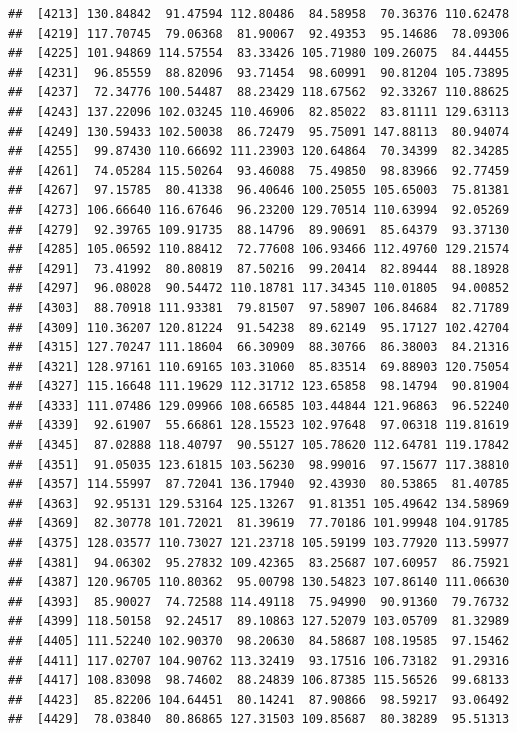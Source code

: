\documentclass[
]{article}
\begin{document}
\begin{verbatim}
##  [4213] 130.84842  91.47594 112.80486  84.58958  70.36376 110.62478
##  [4219] 117.70745  79.06368  81.90067  92.49353  95.14686  78.09306
##  [4225] 101.94869 114.57554  83.33426 105.71980 109.26075  84.44455
##  [4231]  96.85559  88.82096  93.71454  98.60991  90.81204 105.73895
##  [4237]  72.34776 100.54487  88.23429 118.67562  92.33267 110.88625
##  [4243] 137.22096 102.03245 110.46906  82.85022  83.81111 129.63113
##  [4249] 130.59433 102.50038  86.72479  95.75091 147.88113  80.94074
##  [4255]  99.87430 110.66692 111.23903 120.64864  70.34399  82.34285
##  [4261]  74.05284 115.50264  93.46088  75.49850  98.83966  92.77459
##  [4267]  97.15785  80.41338  96.40646 100.25055 105.65003  75.81381
##  [4273] 106.66640 116.67646  96.23200 129.70514 110.63994  92.05269
##  [4279]  92.39765 109.91735  88.14796  89.90691  85.64379  93.37130
##  [4285] 105.06592 110.88412  72.77608 106.93466 112.49760 129.21574
##  [4291]  73.41992  80.80819  87.50216  99.20414  82.89444  88.18928
##  [4297]  96.08028  90.54472 110.18781 117.34345 110.01805  94.00852
##  [4303]  88.70918 111.93381  79.81507  97.58907 106.84684  82.71789
##  [4309] 110.36207 120.81224  91.54238  89.62149  95.17127 102.42704
##  [4315] 127.70247 111.18604  66.30909  88.30766  86.38003  84.21316
##  [4321] 128.97161 110.69165 103.31060  85.83514  69.88903 120.75054
##  [4327] 115.16648 111.19629 112.31712 123.65858  98.14794  90.81904
##  [4333] 111.07486 129.09966 108.66585 103.44844 121.96863  96.52240
##  [4339]  92.61907  55.66861 128.15523 102.97648  97.06318 119.81619
##  [4345]  87.02888 118.40797  90.55127 105.78620 112.64781 119.17842
##  [4351]  91.05035 123.61815 103.56230  98.99016  97.15677 117.38810
##  [4357] 114.55997  87.72041 136.17940  92.43930  80.53865  81.40785
##  [4363]  92.95131 129.53164 125.13267  91.81351 105.49642 134.58969
##  [4369]  82.30778 101.72021  81.39619  77.70186 101.99948 104.91785
##  [4375] 128.03577 110.73027 121.23718 105.59199 103.77920 113.59977
##  [4381]  94.06302  95.27832 109.42365  83.25687 107.60957  86.75921
##  [4387] 120.96705 110.80362  95.00798 130.54823 107.86140 111.06630
##  [4393]  85.90027  74.72588 114.49118  75.94990  90.91360  79.76732
##  [4399] 118.50158  92.24517  89.10863 127.52079 103.05709  81.32989
##  [4405] 111.52240 102.90370  98.20630  84.58687 108.19585  97.15462
##  [4411] 117.02707 104.90762 113.32419  93.17516 106.73182  91.29316
##  [4417] 108.83098  98.74602  88.24839 106.87385 115.56526  99.68133
##  [4423]  85.82206 104.64451  80.14241  87.90866  98.59217  93.06492
##  [4429]  78.03840  80.86865 127.31503 109.85687  80.38289  95.51313

\end{verbatim}
\end{document}

